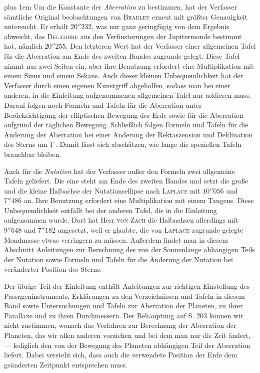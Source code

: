 \begingroup\rightskip=0pt plus 1em
Um die Konstante der \emph{Aberration} zu bestimmen, hat der Verfasser sämtliche Original%
%
beobachtungen von \textsc{Bradley} erneut mit größter Genauigkeit untersucht. Er erhält $20''232$, was nur ganz geringfügig von dem Ergebnis abweicht, das \textsc{Delambre} aus den Verfinsterungen der Jupitermonde bestimmt hat, nämlich $20''255$. Den letzteren Wert hat der Verfasser einer allgemeinen Tafel für die Aberration am Ende des zweiten Bandes zugrunde gelegt. Diese Tafel nimmt nur zwei Seiten ein, aber ihre Benutzung erfordert eine Multiplikation mit einem Sinus und einem Sekans. Auch dieser kleinen Unbequemlichkeit hat der Verfasser durch einen eigenen Kunstgriff abgeholfen, sodass man bei einer anderen, in die Einleitung aufgenommenen allgemeinen Tafel nur addieren muss. Darauf folgen noch Formeln und Tafeln für die Aberration unter Berücksichtigung der elliptischen Bewegung der Erde sowie für die Aberration aufgrund der täglichen Bewegung. Schließlich folgen Formeln und Tafeln für die Änderung der Aberration bei einer Änderung der Rektaszension und Deklination des Sterns um $1^\circ$. Damit lässt sich abschätzen, wie lange die speziellen Tafeln brauchbar bleiben.\par\endgroup

Auch für die \emph{Nutation} hat der Verfasser außer den Formeln zwei allgemeine Tafeln geliefert. Die eine steht am Ende des zweiten Bandes und setzt die große und die kleine Halbachse der Nutationsellipse nach \textsc{Laplace} mit $10''056$ und $7''486$ an. Ihre Benutzung erfordert eine Multiplikation mit einem Tangens. Diese Unbequemlichkeit entfällt bei der anderen Tafel, die in die Einleitung aufgenommen wurde. Dort hat Herr \textsc{von Zach} die Halbachsen allerdings mit $9''648$ und $7''182$ angesetzt, weil er glaubte, die von \textsc{Laplace} zugrunde gelegte Mondmasse etwas verringern zu müssen. Außerdem findet man in diesem Abschnitt Anleitungen zur Berechnung des von der Sonnenlänge abhängigen Teils der Nutation sowie Formeln und Tafeln für die Änderung der Nutation bei veränderter Position des Sterns.

Der übrige Teil der Einleitung enthält Anleitungen zur richtigen Einstellung des Passageninstruments, Erklärungen zu den Verzeichnissen und Tafeln in diesem Band sowie Untersuchungen und Tafeln zur Aberration der Planeten, zu ihrer Parallaxe und zu ihren Durchmessern. Der Behauptung auf S. 203 können wir nicht zustimmen, wonach das Verfahren zur Berechnung der Aberration der Planeten, das wir allen anderen vorziehen und bei dem man nur die Zeit ändert, --- lediglich den von der Bewegung des Planeten abhängigen Teil der Aberration liefert. Dabei versteht sich, dass auch die verwendete Position der Erde dem geänderten Zeitpunkt entsprechen muss.

